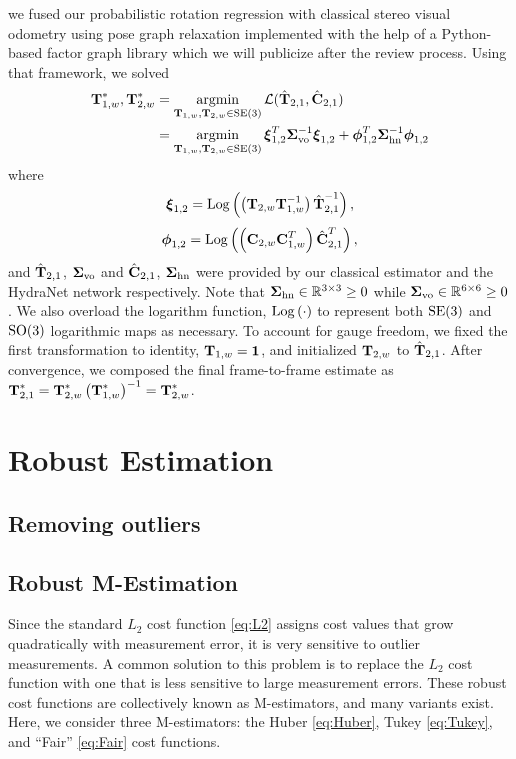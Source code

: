 we fused our probabilistic rotation regression with classical stereo visual odometry using pose graph relaxation implemented with the help of a Python-based factor graph library which we will publicize after the review process. Using that framework, we solved
\begin{align}
	\boldsymbol{\mathbf{T}}_{1,w}^*, \boldsymbol{\mathbf{T}}_{2,w}^* &= \operatorname*{argmin}_{\boldsymbol{\mathbf{T}}_{1,w}, \boldsymbol{\mathbf{T}}_{2,w}\in\text{SE}(3)}\mathcal{L}(\hat{\boldsymbol{\mathbf{T}}}_{2,1}, \hat{\boldsymbol{\mathbf{C}}}_{2,1}) \\ & = \operatorname*{argmin}_{\boldsymbol{\mathbf{T}}_{1,w}, \boldsymbol{\mathbf{T}}_{2,w}\in\text{SE}(3)} \boldsymbol{\mathbf{\xi}}_\text{1,2}^T \boldsymbol{\mathbf{\Sigma}}^{-1}_\text{vo} \boldsymbol{\mathbf{\xi}}_\text{1,2} + \boldsymbol{\mathbf{\phi}}_\text{1,2}^T \boldsymbol{\mathbf{\Sigma}}^{-1}_{\text{hn}} \boldsymbol{\mathbf{\phi}}_\text{1,2} 
\end{align}
where
\begin{equation}
	\boldsymbol{\mathbf{\xi}}_\text{1,2} =  \mathrm{Log}\left({\left(\boldsymbol{\mathbf{T}}_{2,w} \boldsymbol{\mathbf{T}}_{1,w}^{-1} \right)\hat{\boldsymbol{\mathbf{T}}}_{2,1}^{-1}}\right),
\end{equation}
\begin{equation}
	\boldsymbol{\mathbf{\phi}}_\text{1,2} =  \mathrm{Log}\left({\left(\boldsymbol{\mathbf{C}}_{2,w} \boldsymbol{\mathbf{C}}_{1,w}^{T} \right)\hat{\boldsymbol{\mathbf{C}}}_{2,1}^{T}}\right),
\end{equation}
and $\hat{\boldsymbol{\mathbf{T}}}_{2,1}$, $\boldsymbol{\mathbf{\Sigma}}_\text{vo}$ and $\hat{\boldsymbol{\mathbf{C}}}_{2,1}$, $\boldsymbol{\mathbf{\Sigma}}_{\text{hn}}$ were provided by our classical estimator and the HydraNet network respectively. Note that $\boldsymbol{\mathbf{\Sigma}}_{\text{hn}} \in \mathbb{R}^{3 \times 3} \geq 0$ while $\boldsymbol{\mathbf{\Sigma}}_{\text{vo}} \in \mathbb{R}^{6 \times 6} \geq 0 $. We also overload the logarithm function, $\mathrm{Log}\left({\cdot}\right)$ to represent both $\mathrm{SE}(3)$ and $\mathrm{SO}(3)$ logarithmic maps as necessary. To account for gauge freedom, we fixed the first transformation to identity, $\boldsymbol{\mathbf{T}}_{1,w} = \boldsymbol{\mathbf{1}}$, and initialized $\boldsymbol{\mathbf{T}}_{2,w}$ to  $\hat{\boldsymbol{\mathbf{T}}}_{2,1}$.  After convergence, we composed the final frame-to-frame estimate as $ \boldsymbol{\mathbf{T}}_{2,1}^* =  \boldsymbol{\mathbf{T}}_{2,w}^*  \left(\boldsymbol{\mathbf{T}}_{1,w}^*\right)^{-1} = \boldsymbol{\mathbf{T}}_{2,w}^*$.




\section{Robust Estimation}
\subsection{Removing outliers}
\subsection{Robust M-Estimation}
Since the standard $L_2$ cost function \eqref{eq:L2} assigns cost values that grow quadratically with measurement error, it is very sensitive to outlier measurements.
A common solution to this problem is to replace the $L_2$ cost function with one that is less sensitive to large measurement errors.
These robust cost functions are collectively known as M-estimators, and many variants exist.
Here, we consider three M-estimators: the Huber \eqref{eq:Huber}, Tukey \eqref{eq:Tukey}, and ``Fair'' \eqref{eq:Fair} cost functions.



